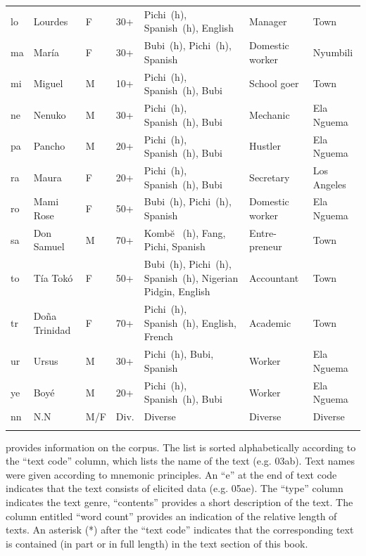 \begin{longtable}{>{\footnotesize}l@{~}>{\footnotesize}l@{~} >{\footnotesize}l@{~}>{\footnotesize}l >{\footnotesize\raggedright}p{3cm} >{\footnotesize\raggedright}p{2cm} >{\footnotesize}l}
lo & Lourdes & \textsc{F} & 30+ & Pichi~(h), Spanish~(h), English & Manager & Town\\
ma & María & \textsc{F} & 30+ & Bubi~(h), Pichi~(h), Spanish & Domestic worker & Nyumbili\\
mi & Miguel & M & 10+ & Pichi~(h), Spanish~(h), Bubi & School goer & Town\\
ne & Nenuko & M & 30+ & Pichi~(h), Spanish~(h), Bubi & Mechanic & Ela Nguema\\
pa & Pancho & M & 20+ & Pichi~(h), Spanish~(h), Bubi & Hustler & Ela Nguema\\
ra & Maura & \textsc{F} & 20+ & Pichi~(h), Spanish~(h), Bubi & Secretary & Los Angeles\\
ro & Mami Rose & \textsc{F} & 50+ & Bubi~(h), Pichi~(h), Spanish & Domestic worker & Ela Nguema\\
sa & Don Samuel & M & 70+ & Kombe\u{} ~(h), Fang, Pichi, Spanish & Entre-preneur & Town\\
to & Tía Tokó & \textsc{F} & 50+ & Bubi~(h), Pichi~(h), Spanish~(h), Nigerian Pidgin, English & Accountant & Town\\
tr & Doña Trinidad & \textsc{F} & 70+ & Pichi~(h), Spanish~(h), English, French & Academic & Town\\
ur & Ursus & M & 30+ & Pichi~(h), Bubi, Spanish & Worker & Ela Nguema\\
ye & Boyé & M & 20+ & Pichi~(h), Spanish~(h), Bubi & Worker & Ela Nguema\\
nn & N.N & M/\textsc{F} & Div. & Diverse & Diverse & Diverse\\
\lspbottomrule
\end{longtable}

 provides information on the corpus. The list is sorted alphabetically according to the “text code” column, which lists the name of the text (e.g. 03ab). Text names were given according to mnemonic principles. An “e” at the end of text code indicates that the text consists of elicited data (e.g. 05ae). The “type” column indicates the text genre, “contents” provides a short description of the text. The column entitled “word count” provides an indication of the relative length of texts. An asterisk (*) after the “text code” indicates that the corresponding text is contained (in part or in full length) in the text section of this book.


